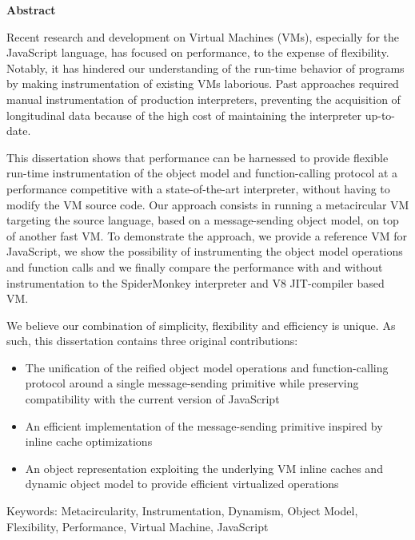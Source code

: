 \begin{center}
\textbf{\large Abstract}
\end{center}

\vspace{1cm}

Recent research and development on Virtual Machines (VMs), especially for the
JavaScript language, has focused on performance, to the expense of flexibility.
Notably, it has hindered our understanding of the run-time behavior of programs
by making instrumentation of existing VMs laborious. Past approaches required
manual instrumentation of production interpreters, preventing the acquisition
of longitudinal data because of the high cost of maintaining the interpreter
up-to-date.
			
This dissertation shows that performance can be harnessed to provide flexible
run-time instrumentation of the object model and function-calling protocol at a
performance competitive with a state-of-the-art interpreter, without having to
modify the VM source code. Our approach consists in running a metacircular VM
targeting the source language, based on a message-sending object model, on top
of another fast VM. To demonstrate the approach, we provide a reference VM for
JavaScript, we show the possibility of instrumenting the object model
operations and function calls and we finally compare the performance with and
without instrumentation to the SpiderMonkey interpreter and V8 JIT-compiler
based VM.
			
We believe our combination of simplicity, flexibility and efficiency is unique.
As such, this dissertation contains three original contributions:

\begin{itemize}
    \item The unification of the reified object model operations and
        function-calling protocol around a single message-sending primitive
        while preserving compatibility with the current version of JavaScript
    \item An efficient implementation of the message-sending primitive inspired
          by inline cache optimizations
    \item An object representation exploiting the underlying VM inline caches
          and dynamic object model to provide efficient virtualized operations
\end{itemize}

Keywords: Metacircularity, Instrumentation, Dynamism, Object Model,
Flexibility, Performance, Virtual Machine, JavaScript  
